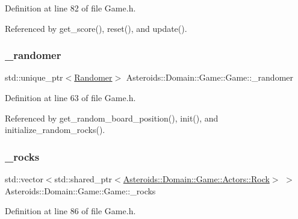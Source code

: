 Definition at line 82 of file Game.\+h.



Referenced by get\+\_\+score(), reset(), and update().

\mbox{\label{classAsteroids_1_1Domain_1_1Game_1_1Game_a0deb897c0ad64573f1892a769185824e}} 
\subsubsection{\texorpdfstring{\+\_\+randomer}{\_randomer}}
{\footnotesize\ttfamily std\+::unique\+\_\+ptr$<$\hyperlink{classAsteroids_1_1Domain_1_1Game_1_1Randomer}{Randomer}$>$ Asteroids\+::\+Domain\+::\+Game\+::\+Game\+::\+\_\+randomer\hspace{0.3cm}{\ttfamily [private]}}



Definition at line 63 of file Game.\+h.



Referenced by get\+\_\+random\+\_\+board\+\_\+position(), init(), and initialize\+\_\+random\+\_\+rocks().

\mbox{\label{classAsteroids_1_1Domain_1_1Game_1_1Game_ad424a9c9f9fdd4bf7785c4da946cb57e}} 
\subsubsection{\texorpdfstring{\+\_\+rocks}{\_rocks}}
{\footnotesize\ttfamily std\+::vector$<$std\+::shared\+\_\+ptr$<$\hyperlink{classAsteroids_1_1Domain_1_1Game_1_1Actors_1_1Rock}{Asteroids\+::\+Domain\+::\+Game\+::\+Actors\+::\+Rock}$>$ $>$ Asteroids\+::\+Domain\+::\+Game\+::\+Game\+::\+\_\+rocks\hspace{0.3cm}{\ttfamily [private]}}



Definition at line 86 of file Game.\+h.



